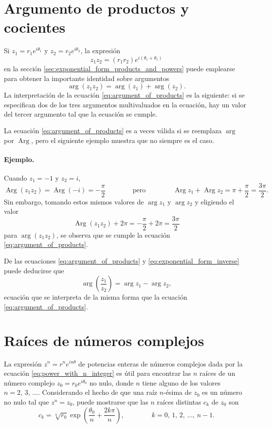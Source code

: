 \documentclass[a4paper]{report}
\DeclareMathOperator{\Arg}{Arg}
\begin{document}
\section{Argumento de productos y cocientes}\label{sec:argument_of_products}

Si \(z_1=r_1e^{i\theta_1}\) y \(z_2=r_2e^{i\theta_2}\), la expresión
\[
 z_1z_2=(r_1r_2)e^{i(\theta_1+\theta_1)}
\]
en la sección \ref{sec:exponential_form_products_and_powers} puede emplearse para obtener la importante identidad sobre argumentos
\begin{equation}\label{eq:argument_of_products}
 \arg(z_1z_2)=\arg(z_1)+\arg(z_2). 
\end{equation} 
La interpretación de la ecuación \ref{eq:argument_of_products} es la siguiente: si se especifican dos de los tres argumentos multivaluados en la ecuación, hay un valor del tercer argumento tal que la ecuación se cumple.

La ecuación \ref{eq:argument_of_products} es a veces válida si se reemplaza \(\arg\) por \(\Arg\), pero el siguiente ejemplo muestra que no siempre es el caso.

\paragraph{Ejemplo.} Cuando \(z_1=-1\) y \(z_2=i\),
\[
 \Arg(z_1z_2)=\Arg(-i)=-\frac{\pi}{2}
 \qquad\qquad\textrm{pero}\qquad\qquad
 \Arg z_1+\Arg z_2=\pi+\frac{\pi}{2}=\frac{3\pi}{2}.
\]
Sin embargo, tomando estos mismos valores de \(\arg z_1\) y \(\arg z_2\) y eligiendo el valor 
\[
 \Arg(z_1z_2)+2\pi=-\frac{\pi}{2}+2\pi=\frac{3\pi}{2}
\]
para \(\arg(z_1z_2)\), se observa que se cumple la ecuación \ref{eq:argument_of_products}.

De las ecuaciones \ref{eq:argument_of_products} y \ref{eq:exponential_form_inverse} puede deducirse que 
\begin{equation}\label{eq:argument_of_quotient}
 \arg\left(\frac{z_1}{z_2}\right)=\arg z_1-\arg z_2, 
\end{equation}
ecuación que se interpreta de la misma forma que la ecuación \ref{eq:argument_of_products}.

\section{Raíces de números complejos}

La expresión \(z^n=r^ne^{in\theta}\) de potencias enteras de números complejos dada por la ecuación \ref{eq:power_with_n_integer} es útil para encontrar las \(n\) raíces de un número complejo \(z_0=r_0e^{i\theta_0}\) no nulo, donde \(n\) tiene alguno de los valores \(n=2,\,3,\,\dots\). Considerando el hecho de que una raíz \(n\)-ésima de \(z_0\) es un número no nulo tal que \(z^n=z_0\), puede mostrarse que las \(n\) raíces distintas \(c_k\) de \(z_0\) son
\begin{equation}\label{eq:roots_n}
 c_k=\sqrt[n]{r_0}\exp\left(\frac{\theta_0}{n}+\frac{2k\pi}{n}\right),
 \qquad\qquad k=0,\,1,\,2,\,\dots,\,n-1. 
\end{equation}
\end{document}
